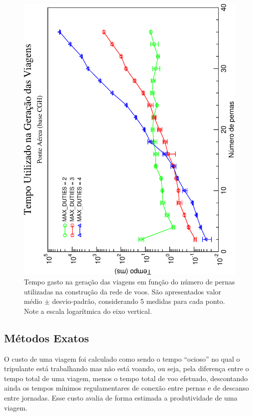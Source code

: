 \documentclass[12pt,a4paper]{article}
\begin{document}
\begin{figure}[htb]
	\begin{center}
		\includegraphics[scale=0.45,angle=-90]{fig/generation_time.eps}
		\caption{Tempo gasto na geração das viagens em função do número de pernas utilizadas na 
		construção da rede de voos. São apresentados valor médio $\pm$ desvio-padrão, considerando 5 
		medidas para cada ponto. Note a escala logarítmica do eixo vertical.}
		\label{fig:generation}
	\end{center}
\end{figure}



\subsection{Métodos Exatos}
\label{sec:resultados_exatos}

O custo de uma viagem foi calculado como sendo o tempo ``ocioso'' no qual o tripulante está 
trabalhando mas não está voando, ou seja, pela diferença entre o tempo total de uma viagem, menos o 
tempo total de voo efetuado, descontando ainda os tempos mínimos regulamentares de conexão entre 
pernas e de descanso entre jornadas. Esse custo avalia de forma estimada a produtividade de uma 
viagem.
\end{document}
